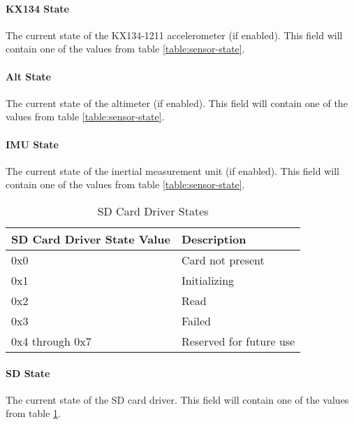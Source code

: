 \paragraph{KX134 State}
The current state of the KX134-1211 accelerometer (if enabled). This field will contain one of the values from table
\ref{table:sensor-state}.

\paragraph{Alt State}
The current state of the altimeter (if enabled). This field will contain one of the values from table
\ref{table:sensor-state}.

\paragraph{IMU State}
The current state of the inertial measurement unit (if enabled). This field will contain one of the values from table
\ref{table:sensor-state}.

\begin{table}[H]
    \centering
    \begin{tabular}{@{}ll@{}}
        \toprule
        SD Card Driver State Value & Description             \\
        \midrule
        0x0                        & Card not present        \\
        0x1                        & Initializing            \\
        0x2                        & Read                    \\
        0x3                        & Failed                  \\
        0x4 through 0x7            & Reserved for future use \\
        \bottomrule
    \end{tabular}
    \caption{SD Card Driver States}
    \label{table:sd-state}
\end{table}

\paragraph{SD State}
The current state of the SD card driver. This field will contain one of the values from table \ref{table:sd-state}.

